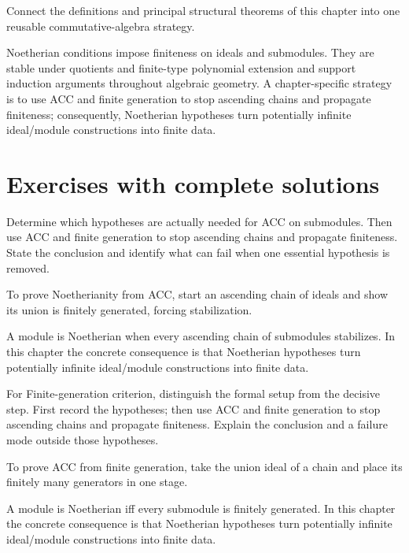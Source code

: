 \begin{problem}\label{prob:v15-problem-12}
Connect the definitions and principal structural theorems of this chapter into one reusable commutative-algebra strategy.
\end{problem}
\begin{solution}
Noetherian conditions impose finiteness on ideals and submodules. They are stable under quotients and finite-type polynomial extension and support induction arguments throughout algebraic geometry. A chapter-specific strategy is to use ACC and finite generation to stop ascending chains and propagate finiteness; consequently, Noetherian hypotheses turn potentially infinite ideal/module constructions into finite data.
\end{solution}

\section{Exercises with complete solutions}

\begin{exercise}\label{exr:v15-01}
Determine which hypotheses are actually needed for ACC on submodules. Then use ACC and finite generation to stop ascending chains and propagate finiteness. State the conclusion and identify what can fail when one essential hypothesis is removed.
\end{exercise}
\begin{hint}
To prove Noetherianity from ACC, start an ascending chain of ideals and show its union is finitely generated, forcing stabilization.
\end{hint}
\begin{solution}
A module is Noetherian when every ascending chain of submodules stabilizes. In this chapter the concrete consequence is that Noetherian hypotheses turn potentially infinite ideal/module constructions into finite data.
\end{solution}

\begin{exercise}\label{exr:v15-02}
For Finite-generation criterion, distinguish the formal setup from the decisive step. First record the hypotheses; then use ACC and finite generation to stop ascending chains and propagate finiteness. Explain the conclusion and a failure mode outside those hypotheses.
\end{exercise}
\begin{hint}
To prove ACC from finite generation, take the union ideal of a chain and place its finitely many generators in one stage.
\end{hint}
\begin{solution}
A module is Noetherian iff every submodule is finitely generated. In this chapter the concrete consequence is that Noetherian hypotheses turn potentially infinite ideal/module constructions into finite data.
\end{solution}

